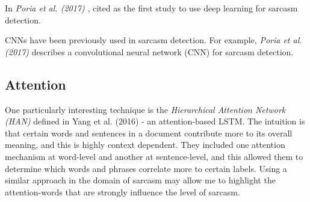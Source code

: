 \documentclass[12pt,a4paper]{article}
\begin{document}
In \textit{Poria et al. (2017)} \cite{poria2016deeper}, cited as the first study to use deep learning for sarcasm detection.


CNNs have been previously used in sarcasm detection. For example, \textit{Poria et al. (2017)} \cite{poria2016deeper} describes a convolutional neural network (CNN) for sarcasm detection. \\

\subsection{Attention}\vspace{-10pt}
One particularly interesting technique is the \textit{Hierarchical Attention Network (HAN)} defined in Yang et al. (2016) \cite{yang2016hierarchical} - an attention-based LSTM. The intuition is that certain words and sentences in a document contribute more to its overall meaning, and this is highly context dependent. They included one attention mechanism at word-level and another at sentence-level, and this allowed them to determine which words and phrases correlate more to certain labels. Using a similar approach in the domain of sarcasm may allow me to highlight the attention-words that are strongly influence the level of sarcasm.









\end{document}
